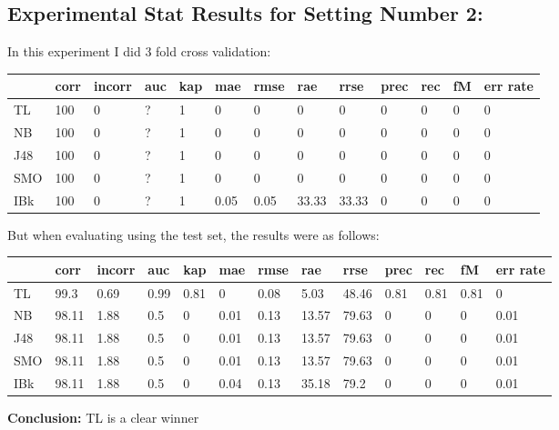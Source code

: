 \documentclass[a4paper,12pt, english]{article}
\begin{document}
\subsection{Experimental Stat Results for Setting Number 2:}
In this experiment I did 3 fold cross validation:
\begin{small}
\begin{center}
    \begin{tabular}{ | l | l | l | l | l | l | l | l | l | l | l | l | l |}
    \hline
      	& corr & incorr  & auc & kap & mae & rmse & rae & rrse & prec & rec & fM & err rate\\ \hline
      	TL & 100 & 0 & ? & 1 & 0 & 0 & 0 & 0 & 0 & 0 & 0 & 0\\ \hline
	NB & 100 & 0 & ? & 1 & 0 & 0 & 0 & 0 & 0 & 0 & 0 & 0\\ \hline
	J48 & 100 & 0 & ? & 1 & 0 & 0 & 0 & 0 & 0 & 0 & 0 & 0\\ \hline
	SMO & 100 & 0 & ? & 1 & 0 & 0 & 0 & 0 & 0 & 0 & 0 & 0\\ \hline
	IBk & 100 & 0 & ? & 1 & 0.05 & 0.05 & 33.33 & 33.33 & 0 & 0 & 0 & 0\\ \hline  
    \end{tabular}       
\end{center}
\end{small}

But when evaluating using the test set, the results were as follows:
\begin{small}
\begin{center}
    \begin{tabular}{ | l | l | l | l | l | l | l | l | l | l | l | l | l |}
    \hline
      	& corr & incorr  & auc & kap & mae & rmse & rae & rrse & prec & rec & fM & err rate\\ \hline
      	TL & 99.3 & 0.69 & 0.99 & 0.81 & 0 & 0.08 & 5.03 & 48.46 & 0.81 & 0.81 & 0.81 & 0\\ \hline
	NB & 98.11 & 1.88 & 0.5 & 0 & 0.01 & 0.13 & 13.57 & 79.63 & 0 & 0 & 0 & 0.01\\ \hline
	J48 & 98.11 & 1.88 & 0.5 & 0 & 0.01 & 0.13 & 13.57 & 79.63 & 0 & 0 & 0 & 0.01\\ \hline
	SMO & 98.11 & 1.88 & 0.5 & 0 & 0.01 & 0.13 & 13.57 & 79.63 & 0 & 0 & 0 & 0.01\\ \hline
	IBk & 98.11 & 1.88 & 0.5 & 0 & 0.04 & 0.13 & 35.18 & 79.2 & 0 & 0 & 0 & 0.01\\ \hline  
    \end{tabular}       
\end{center}
\end{small}
\textbf{Conclusion:} TL is a clear winner
\end{document}
